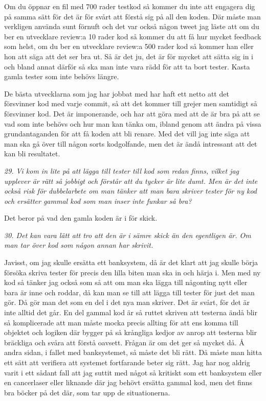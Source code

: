 \documentclass[11pt]{article}
\begin{document}
Om du öppnar en fil med 700 rader testkod så kommer du inte att engagera dig på samma sätt för det är för svårt att förstå sig på all den koden. Där måste man verkligen använda sunt förnuft och det var också någon tweet jag läste att om du ber en utvecklare review:a 10 rader kod så kommer du att få hur mycket feedback som helst, om du ber en utvecklare review:a 500 rader kod så kommer han eller hon att säga att det ser bra ut. Så är det ju, det är för mycket att sätta sig in i och bland annat därför så ska man inte vara rädd för att ta bort tester. Kasta gamla tester som inte behövs längre.

De bästa utvecklarna som jag har jobbat med har haft ett netto att det försvinner kod med varje commit, så att det kommer till grejer men samtidigt så försvinner kod. Det är imponerande, och har att göra med att de är bra på att se vad som inte behövs och hur man kan tänka om, ibland genom att ändra på vissa grundantaganden för att få koden att bli renare. Med det vill jag inte säga att man ska gå över till någon sorts kodgolfande, men det är ändå intressant att det kan bli resultatet.

\emph{29. Vi kom in lite på att lägga till tester till kod som redan finns, vilket jag upplever är rätt så jobbigt och förstår att du tycker är lite dumt. Men är det inte också risk för dubbelarbete om man tänker att man bara skriver tester för ny kod och ersätter gammal kod som man inser inte funkar så bra?}

Det beror på vad den gamla koden är i för skick.

\emph{30. Det kan vara lätt att tro att den är i sämre skick än den egentligen är. Om man tar över kod som någon annan har skrivit.}

Javisst, om jag skulle ersätta ett banksystem, då är det klart att jag skulle börja försöka skriva tester för precis den lilla biten man ska in och härja i. Men med ny kod så tänker jag också som så att om man ska lägga till någonting nytt eller bara är inne och roddar, då kan man se till att lägga till tester för just det man gör. Då gör man det som en del i det nya man skriver. Det är svårt, för det är inte alltid det går. En del gammal kod är så ruttet skriven att testerna ändå blir så komplicerade att man måste mocka precis allting för att ens komma till objektet och logiken där bygger på så krångliga kedjor av anrop att testerna blir bräckliga och svåra att förstå oavsett. Frågan är om det ger så mycket då. Å andra sidan, i fallet med banksystemet, så måste det bli rätt. Då måste man hitta ett sätt att verifiera att systemet fortfarande beter sig rätt. Jag har nog aldrig varit i ett sådant fall att jag suttit med något så kritiskt som ett banksystem eller en cancerlaser eller liknande där jag behövt ersätta gammal kod, men det finns bra böcker på det där, som tar upp de situationerna.
\end{document}
